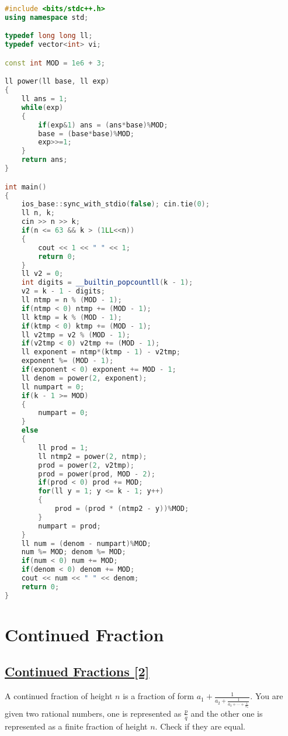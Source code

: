 \documentclass[10pt,a4paper]{article}
\begin{document}
\begin{itemize}
\begin{lstlisting}[language=C++, caption={Zeus and The Birthday Paradox},label={1st:code}, mathescape=true, breaklines=true]
#include <bits/stdc++.h>
using namespace std;

typedef long long ll;
typedef vector<int> vi;

const int MOD = 1e6 + 3;

ll power(ll base, ll exp)
{
	ll ans = 1;
    while(exp)
    {
		if(exp&1) ans = (ans*base)%MOD;
		base = (base*base)%MOD;
		exp>>=1;
	}
    return ans;
}

int main()
{
	ios_base::sync_with_stdio(false); cin.tie(0);
	ll n, k;
	cin >> n >> k;
	if(n <= 63 && k > (1LL<<n))
	{
		cout << 1 << " " << 1;
		return 0;
	}
	ll v2 = 0;
	int digits = __builtin_popcountll(k - 1);
	v2 = k - 1 - digits;
	ll ntmp = n % (MOD - 1);
	if(ntmp < 0) ntmp += (MOD - 1);
	ll ktmp = k % (MOD - 1);
	if(ktmp < 0) ktmp += (MOD - 1);
	ll v2tmp = v2 % (MOD - 1);
	if(v2tmp < 0) v2tmp += (MOD - 1);
	ll exponent = ntmp*(ktmp - 1) - v2tmp;
	exponent %= (MOD - 1);
	if(exponent < 0) exponent += MOD - 1;
	ll denom = power(2, exponent);
	ll numpart = 0;
	if(k - 1 >= MOD)
	{
		numpart = 0;
	}
	else
	{
		ll prod = 1;
		ll ntmp2 = power(2, ntmp);
		prod = power(2, v2tmp);
		prod = power(prod, MOD - 2);
		if(prod < 0) prod += MOD;
		for(ll y = 1; y <= k - 1; y++)
		{
			prod = (prod * (ntmp2 - y))%MOD;
		}
		numpart = prod;
	}
	ll num = (denom - numpart)%MOD;
	num %= MOD; denom %= MOD;
	if(num < 0) num += MOD;
	if(denom < 0) denom += MOD;
	cout << num << " " << denom;
	return 0;
}
\end{lstlisting}

\section{Continued Fraction}
\subsection*{\href{https://codeforces.com/contest/305/problem/B}{\underline{Continued Fractions [2]}}}

A continued fraction of height $n$ is a fraction of form $a_1 + \frac{1}{a_2 + \frac{1}{a_3 + \cdots + \frac{1}{a_n}}}$. You are given two rational numbers, one is represented as $\frac{p}{q}$ and the other one is represented as a finite fraction of height $n$. Check if they are equal.


\end{itemize}
\end{document}
